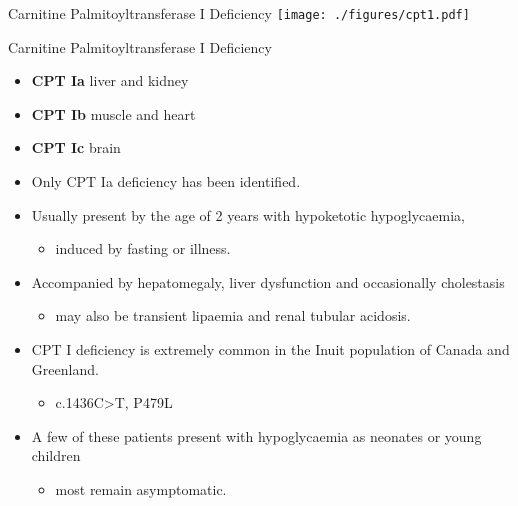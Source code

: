 \documentclass[presentation, smaller]{beamer}
\begin{document}
\begin{frame}[label={sec:orgheadline6}]{Carnitine Palmitoyltransferase I Deficiency}
\texttt{[image: ./figures/cpt1.pdf]}
\end{frame}
\begin{frame}[label={sec:orgheadline7}]{Carnitine Palmitoyltransferase I Deficiency}
\begin{itemize}
\item \textbf{CPT Ia} liver and kidney
\item \textbf{CPT Ib}  muscle and heart
\item \textbf{CPT Ic}  brain

\item Only CPT Ia deficiency has been identified.
\item Usually present by the age of 2 years with hypoketotic hypoglycaemia,
\begin{itemize}
\item induced by fasting or illness.
\end{itemize}
\item Accompanied by hepatomegaly, liver dysfunction and occasionally cholestasis
\begin{itemize}
\item may also be transient lipaemia and renal tubular acidosis.
\end{itemize}
\item CPT I deficiency is extremely common in the Inuit population of Canada and Greenland.
\begin{itemize}
\item c.1436C>T, P479L
\end{itemize}
\item A few of these patients present with hypoglycaemia as neonates or young children
\begin{itemize}
\item most remain asymptomatic.
\end{itemize}
\end{itemize}
\end{frame}
\end{document}
